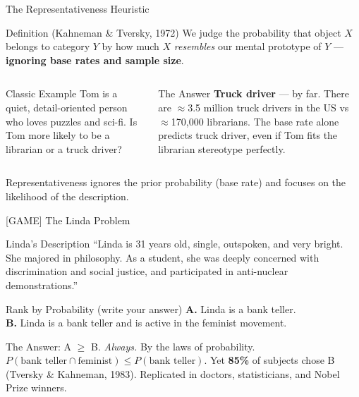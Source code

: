 \documentclass[aspectratio=169]{beamer}
\begin{document}
\begin{frame}{The Representativeness Heuristic}
\begin{block}{Definition (Kahneman \& Tversky, 1972)}
We judge the probability that object $X$ belongs to category $Y$ by how much $X$ \textit{resembles} our mental prototype of $Y$ --- \textbf{ignoring base rates and sample size}.
\end{block}
\begin{columns}
\begin{exampleblock}{Classic Example}
Tom is a quiet, detail-oriented person who loves puzzles and sci-fi. Is Tom more likely to be a librarian or a truck driver?
\end{exampleblock}
\pause
{}
\begin{alertblock}{The Answer}
\textbf{Truck driver} --- by far. There are $\approx$3.5 million truck drivers in the US vs $\approx$170,000 librarians. The base rate alone predicts truck driver, even if Tom fits the librarian stereotype perfectly.
\end{alertblock}
\end{columns}
\medskip
Representativeness ignores the \alert{prior probability} (base rate) and focuses on the \alert{likelihood} of the description.
\end{frame}

\begin{frame}{[GAME] The Linda Problem}
\begin{exampleblock}{Linda's Description}
``Linda is 31 years old, single, outspoken, and very bright. She majored in philosophy. As a student, she was deeply concerned with discrimination and social justice, and participated in anti-nuclear demonstrations.''
\end{exampleblock}
\begin{alertblock}{Rank by Probability (write your answer)}
\textbf{A.} Linda is a bank teller.\\[0.3em]
\textbf{B.} Linda is a bank teller and is active in the feminist movement.
\end{alertblock}
\pause
\begin{block}{The Answer: A $\geq$ B. \textit{Always.} By the laws of probability.}
$P(\text{bank teller} \cap \text{feminist}) \leq P(\text{bank teller})$. Yet \textbf{85\%} of subjects chose B (Tversky \& Kahneman, 1983). Replicated in doctors, statisticians, and Nobel Prize winners.
\end{block}
\end{frame}
\end{document}
